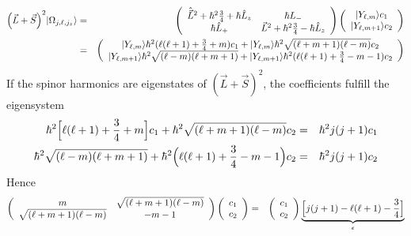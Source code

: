 \documentclass[11pt,a4paper]{report}
\begin{document}
\begin{eqnarray*}
\Bigl(\vec{L}+\vec{S}\Bigr)^2|\Omega_{j,\ell,j_z}\rangle
&=&\left(\begin{array}{cc}\hat{\vec{L}}^2+\hbar^2\frac{3}{4}+\hbar\hat{L}_z&\hbar L_-\\
\hbar\hat{L}_+&\vec{L}^2+\hbar^2\frac{3}{4}-\hbar\hat{L}_z\end{array}\right)
\left(\begin{array}{c}|Y_{\ell,m}\rangle c_1\\|Y_{\ell,m+1}\rangle c_2\end{array}\right)
\\
&=&\left(\begin{array}{c}|Y_{\ell,m}\rangle
\hbar^2(\ell(\ell+1)+\frac{3}{4}+m)c_1
+|Y_{\ell,m}\rangle\hbar^2\sqrt{(\ell+m+1)(\ell-m)}c_2
\\
|Y_{\ell,m+1}\rangle\hbar^2\sqrt{(\ell-m)(\ell+m+1)}
+|Y_{\ell,m+1}\rangle\hbar^2(\ell(\ell+1)+\frac{3}{4}-m-1) c_2
\end{array}\right)
\end{eqnarray*}
If the spinor harmonics are eigenstates of
$\left(\vec{L}+\vec{S}\right)^2$, the coefficients fulfill the
eigensystem
\begin{eqnarray*}
\hbar^2\Bigl[\ell(\ell+1)+\frac{3}{4}+m\Bigr]c_1
+\hbar^2\sqrt{(\ell+m+1)(\ell-m)}c_2&=&\hbar^2 j(j+1) c_1
\\
\hbar^2\sqrt{(\ell-m)(\ell+m+1)}
+\hbar^2\Bigl(\ell(\ell+1)+\frac{3}{4}-m-1\Bigr) c_2&=&\hbar^2 j(j+1)c_2
\end{eqnarray*}
Hence
\begin{eqnarray*}
\left(\begin{array}{cc}m &\sqrt{(\ell+m+1)(\ell-m)}\\
\sqrt{(\ell+m+1)(\ell-m)} & -m-1\end{array}\right)
\left(\begin{array}{c}c_1\\c_2\end{array}\right)
&=&\left(\begin{array}{c}c_1\\c_2\end{array}\right)
\underbrace{\Bigl[j(j+1)-\ell(\ell+1)-\frac{3}{4}\Bigr] }_{\epsilon}
\end{eqnarray*}
\end{document}
